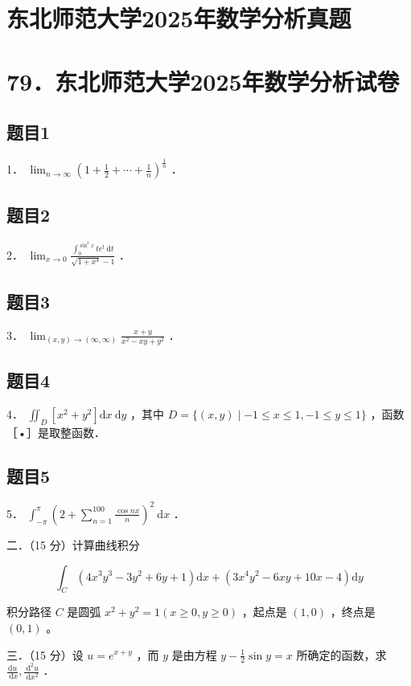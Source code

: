 \documentclass{article}
\begin{document}
\section*{东北师范大学2025年数学分析真题}
\section*{79．东北师范大学2025年数学分析试卷}

\subsection{题目1}
1． \(\lim _{n \rightarrow \infty}\left(1+\frac{1}{2}+\cdots+\frac{1}{n}\right)^{\frac{1}{n}}\) ．

\subsection{题目2}
2． \(\lim _{x \rightarrow 0} \frac{\int_{0}^{\sin ^{2} x} t e^{t} \mathrm{~d} t}{\sqrt{1+x^{4}}-1}\) ．

\subsection{题目3}
3． \(\lim _{(x, y) \rightarrow(\infty, \infty)} \frac{x+y}{x^{2}-x y+y^{2}}\) ．

\subsection{题目4}
4． \(\iint_{D}\left[x^{2}+y^{2}\right] \mathrm{d} x \mathrm{~d} y\) ，其中 \(D=\{(x, y) \mid-1 \leq x \leq 1,-1 \leq y \leq 1\}\) ，函数［•］是取整函数．

\subsection{题目5}
5． \(\int_{-\pi}^{\pi}\left(2+\sum_{n=1}^{100} \frac{\cos n x}{n}\right)^{2} \mathrm{~d} x\) ．

二．（15 分）计算曲线积分

\[
\int_{C}\left(4 x^{3} y^{3}-3 y^{2}+6 y+1\right) \mathrm{d} x+\left(3 x^{4} y^{2}-6 x y+10 x-4\right) \mathrm{d} y
\]

积分路径 \(C\) 是圆弧 \(x^{2}+y^{2}=1(x \geq 0, y \geq 0)\) ，起点是 \((1,0)\) ，终点是 \((0,1)\) 。

三．（15 分）设 \(u=e^{x+y}\) ，而 \(y\) 是由方程 \(y-\frac{1}{2} \sin y=x\) 所确定的函数，求 \(\frac{\mathrm{d} u}{\mathrm{~d} x}, \frac{\mathrm{~d}^{2} u}{\mathrm{~d} x^{2}}\) ．
\end{document}
